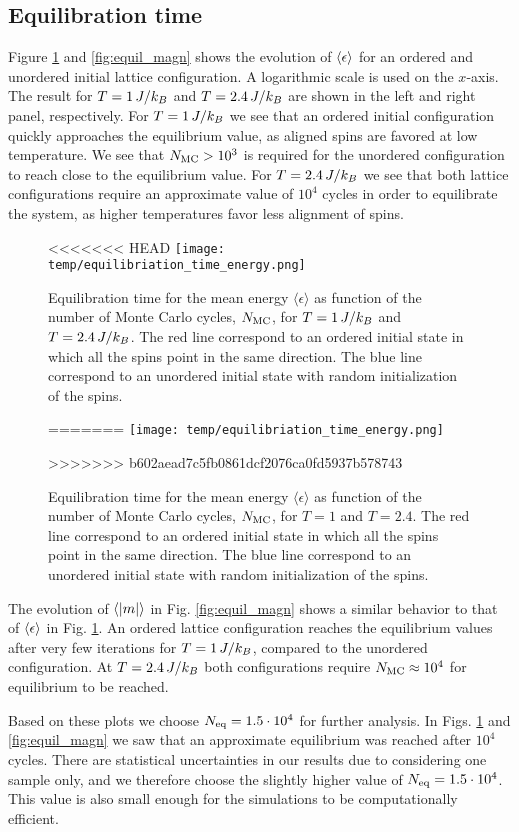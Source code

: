 \subsection{Equilibration time}\label{subsec_results:equilibriation_time}
Figure \ref{fig:equil_energy} and \ref{fig:equil_magn} shows the evolution of $\expval{\epsilon}$ for an ordered and unordered initial lattice configuration. A logarithmic scale is used on the $x$-axis. The result for $T=1\,J/k_B$ and $T=2.4\,J/k_B$ are shown in the left and right panel, respectively. For $T=1\,J/k_B$ we see that an ordered initial configuration quickly approaches the equilibrium value, as aligned spins are favored at low temperature. We see that $N_\mathrm{MC}>10^3$ is required for the unordered configuration to reach close to the equilibrium value. For $T=2.4\,J/k_B$ we see that both lattice configurations require an approximate value of $10^4$ cycles in order to equilibrate the system, as higher temperatures favor less alignment of spins.    
\begin{figure}[!ht]
<<<<<<< HEAD
    \texttt{[image: temp/equilibriation\_time\_energy.png]}
    \caption{Equilibration time for the mean energy $\langle \epsilon \rangle $ as function of the number of Monte Carlo cycles, $N_\mathrm{MC}$, for $T=1\,J/k_B$ and $T=2.4\,J/k_B$. The red line correspond to an ordered initial state in which all the spins point in the same direction. The blue line correspond to an unordered initial state with random initialization of the spins.}

=======
    \texttt{[image: temp/equilibriation\_time\_energy.png]}
    \caption{Equilibration time for the mean energy $\langle \epsilon \rangle$ as function of the number of Monte Carlo cycles, $N_\mathrm{MC}$, for $T=1$ and $T=2.4$. The red line correspond to an ordered initial state in which all the spins point in the same direction. The blue line correspond to an unordered initial state with random initialization of the spins.}
>>>>>>> b602aead7c5fb0861dcf2076ca0fd5937b578743
    \label{fig:equil_energy}
\end{figure}
The evolution of $\expval{\abs{m}}$ in Fig. \ref{fig:equil_magn} shows a similar behavior to that of $\expval{\epsilon}$ in Fig. \ref{fig:equil_energy}. An ordered lattice configuration reaches the equilibrium values after very few iterations for $T=1\,J/k_B$, compared to the unordered configuration. At $T=2.4\,J/k_B$ both configurations require $N_\mathrm{MC}\approx10^4$ for equilibrium to be reached. 

Based on these plots we choose $N_\mathrm{eq}=1.5\cdot10^4$ for further analysis. In Figs. \ref{fig:equil_energy} and \ref{fig:equil_magn} we saw that an approximate equilibrium was reached after $10^4$ cycles. There are statistical uncertainties in our results due to considering one sample only, and we therefore choose the slightly higher value of $N_\mathrm{eq}=1.5\cdot10^4$. This value is also small enough for the simulations to be computationally efficient.

